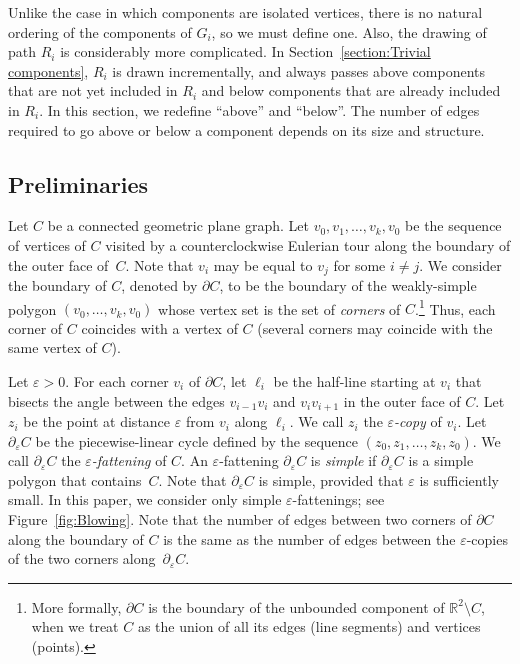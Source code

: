 \documentclass[11pt]{patmorin}
\begin{document}
Unlike the case in which
components are isolated vertices, there is no natural ordering of the
components of $G_i$, so we must define one. Also, the drawing
of path $R_i$ is considerably more complicated.  In Section~\ref{section:Trivial components}, $R_i$ is drawn incrementally, and always passes above components that are not yet included in $R_i$ and below components that are already included in $R_i$.  In this section, we redefine ``above'' and ``below''. The number of edges required to go above or below a component depends on its size and structure.

\subsection{Preliminaries}\label{section:Preliminaries} 
Let $C$ be a connected geometric plane graph. 
Let $v_0, v_1, \ldots, v_k, v_0$ be the sequence of vertices of $C$ visited by a counterclockwise
Eulerian tour along the boundary of the outer face of~$C$. 
Note that $v_i$ may be equal to $v_j$ for some $i\neq j$.  
We consider the boundary of $C$, denoted by $\partial C$, to be the
boundary of the weakly-simple polygon $(v_0, \ldots, v_k, v_0)$ whose
vertex set is the set of \emph{corners} of $C$.\footnote{More formally, $\partial C$ is the boundary of the unbounded component of $\mathbb{R}^2\setminus C$, when we treat $C$ as the union of all its edges (line segments) and vertices (points).}
Thus, each corner of $C$ coincides with a vertex of $C$ (several corners may coincide with the same vertex of $C$).

Let $\varepsilon >0$. For each corner $v_i$ of $\partial C$, let $\ell_i$ be the half-line starting at $v_i$ that bisects the angle between the edges $v_{i-1}v_i$ and $v_i v_{i+1}$ in the outer face of $C$. Let $z_i$ be the point at distance $\varepsilon$ from $v_i$ along $\ell_i$. We call $z_i$ the \emph{$\varepsilon$-copy} of $v_i$. Let $\partial_\varepsilon C$ be the piecewise-linear cycle defined by the sequence $(z_0, z_1, \ldots, z_k, z_0)$. We call $\partial_\varepsilon C$ the \emph{$\varepsilon$-fattening} of $C$.
An $\varepsilon$-fattening $\partial_\varepsilon C$ is \emph{simple} if $\partial_\varepsilon C$  is a simple polygon that contains~$C$.
Note that $\partial_\varepsilon C$ is simple, provided that $\varepsilon$ is sufficiently small. In this paper, we consider only simple $\varepsilon$-fattenings; see Figure~\ref{fig:Blowing}. Note that the number of edges between two corners of $\partial C$ along the boundary of $C$ is the same as the number of edges between the $\varepsilon$-copies of the two corners along~$\partial_\varepsilon C$.
\end{document}
